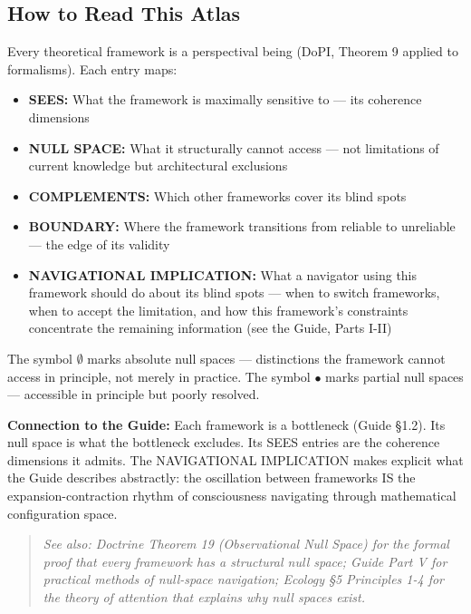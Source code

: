 \subsection*{How to Read This Atlas}


Every theoretical framework is a perspectival being (DoPI, Theorem 9 applied to formalisms). Each entry maps:


\begin{itemize}[nosep,leftmargin=*]
  \item \textbf{SEES:} What the framework is maximally sensitive to — its coherence dimensions
  \item \textbf{NULL SPACE:} What it structurally cannot access — not limitations of current knowledge but architectural exclusions
  \item \textbf{COMPLEMENTS:} Which other frameworks cover its blind spots
  \item \textbf{BOUNDARY:} Where the framework transitions from reliable to unreliable — the edge of its validity
  \item \textbf{NAVIGATIONAL IMPLICATION:} What a navigator using this framework should do about its blind spots — when to switch frameworks, when to accept the limitation, and how this framework's constraints concentrate the remaining information (see the Guide, Parts I-II)
\end{itemize}


The symbol $\emptyset$ marks absolute null spaces — distinctions the framework cannot access in principle, not merely in practice. The symbol $\bullet$ marks partial null spaces — accessible in principle but poorly resolved.


\textbf{Connection to the Guide:} Each framework is a bottleneck (Guide §1.2). Its null space is what the bottleneck excludes. Its SEES entries are the coherence dimensions it admits. The NAVIGATIONAL IMPLICATION makes explicit what the Guide describes abstractly: the oscillation between frameworks IS the expansion-contraction rhythm of consciousness navigating through mathematical configuration space.


\begin{quote}
\itshape
\textit{See also: Doctrine Theorem 19 (Observational Null Space) for the formal proof that every framework has a structural null space; Guide Part V for practical methods of null-space navigation; Ecology §5 Principles 1-4 for the theory of attention that explains why null spaces exist.}
\end{quote}


\bigskip\noindent\makebox[\textwidth]{\color{rulegray}\rule{5cm}{0.3pt}}\bigskip
